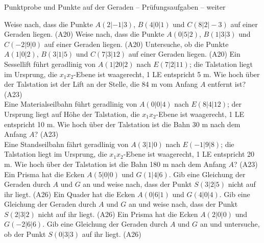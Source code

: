 \begin{aufgabe}{Punktprobe und Punkte auf der Geraden – Prüfungsaufgaben – weiter}
\begin{teile}
\teil Weise nach, dass die Punkte $A(2 | -1 | 3)$, $B(4 | 0 | 1)$ und $C(8 | 2 | -3)$ auf einer Geraden liegen. \hfill (A20)
\teil Weise nach, dass die Punkte $A(0 | 5 | 2)$, $B(1 | 3 | 3)$ und $C(-2 | 9 | 0)$ auf einer Geraden liegen. \hfill (A20)
\teil Untersuche, ob die Punkte $A(1 | 0 | 2)$, $B(3 | 1 | 5)$ und $C(7 | 3 | 12)$ auf einer Geraden liegen. \hfill (A20)
\teil Ein Sessellift führt geradlinig von $A(1 | 20 | 2)$ nach $E(7 | 2 | 11)$; die Talstation liegt im Ursprung, die $x_1x_2$-Ebene ist waagerecht, 1 LE entspricht 5 m. Wie hoch über der Talstation ist der Lift an der Stelle, die 84 m vom Anfang $A$ entfernt ist? \hfill (A23) \\ \leerfeld[m]
\teil Eine Materialseilbahn führt geradlinig von $A(0 | 0 | 4)$ nach $E(8 | 4 | 12)$; der Ursprung liegt auf Höhe der Talstation, die $x_1x_2$-Ebene ist waagerecht, 1 LE entspricht 10 m. Wie hoch über der Talstation ist die Bahn 30 m nach dem Anfang $A$? \hfill (A23) \\ \leerfeld[m]
\teil Eine Standseilbahn fährt geradlinig von $A(3 | 1 | 0)$ nach $E(-1 | 9 | 8)$; die Talstation liegt im Ursprung, die $x_1x_2$-Ebene ist waagerecht, 1 LE entspricht 20 m. Wie hoch über der Talstation ist die Bahn 180 m nach dem Anfang $A$? \hfill (A23) \\ \leerfeld[m]
\teil Ein Prisma hat die Ecken $A(5 | 0 | 0)$ und $G(1 | 4 | 6)$. Gib eine Gleichung der Geraden durch $A$ und $G$ an und weise nach, dass der Punkt $S(3 | 2 | 5)$ nicht auf ihr liegt. \hfill (A26)
\teil Ein Quader hat die Ecken $A(0 | 6 | 1)$ und $G(4 | 0 | 4)$. Gib eine Gleichung der Geraden durch $A$ und $G$ an und weise nach, dass der Punkt $S(2 | 3 | 2)$ nicht auf ihr liegt. \hfill (A26)
\teil Ein Prisma hat die Ecken $A(2 | 0 | 0)$ und $G(-2 | 6 | 6)$. Gib eine Gleichung der Geraden durch $A$ und $G$ an und untersuche, ob der Punkt $S(0 | 3 | 3)$ auf ihr liegt. \hfill (A26)
\end{teile}
\end{aufgabe}

